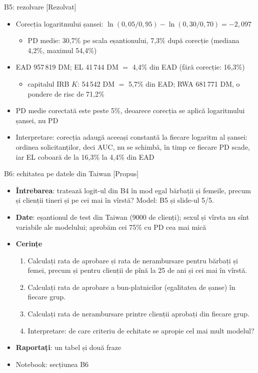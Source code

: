 \begin{frame}{B5: rezolvare [Rezolvat]}
\itemsize{\footnotesize}
\begin{itemize}
    \item Corecția logaritmului șansei: $\ln(0{,}05/0{,}95) - \ln(0{,}30/0{,}70) = -2{,}097$
    \begin{itemize}
        \item PD medie: 30{,}7\% pe scala eșantionului, 7{,}3\% după corecție (mediana 4{,}2\%, maximul 54{,}4\%)
    \end{itemize}
    \item EAD 957\,819 DM; EL 41\,744 DM $=$ 4{,}4\% din EAD (fără corecție: 16{,}3\%)
    \begin{itemize}
        \item capitalul IRB $K$: 54\,542 DM $=$ 5{,}7\% din EAD; RWA 681\,771 DM, o pondere de risc de 71{,}2\%
    \end{itemize}
    \item PD medie corectată este peste 5\%, deoarece corecția se aplică logaritmului șansei, nu PD
    \item Interpretare: corecția adaugă aceeași constantă la fiecare logaritm al șansei: ordinea solicitanților, deci AUC, nu se schimbă, în timp ce fiecare PD scade, iar EL coboară de la 16{,}3\% la 4{,}4\% din EAD
\end{itemize}
\end{frame}

\begin{frame}{B6: echitatea pe datele din Taiwan [Propus]}
\itemsize{\footnotesize}
\begin{itemize}
\item \textbf{Întrebarea}: tratează logit-ul din B4 în mod egal bărbații și femeile, precum și clienții tineri și pe cei mai în vîrstă? Model: B5 și slide-ul 5/5.
\item \textbf{Date}: eșantionul de test din Taiwan (9000 de clienți); sexul și vîrsta nu sînt variabile ale modelului; aprobăm cei 75\% cu PD cea mai mică
\item \textbf{Cerințe}
\begin{enumerate}
    \item Calculați rata de aprobare și rata de nerambursare pentru bărbați și femei, precum și pentru clienții de pînă la 25 de ani și cei mai în vîrstă.
    \item Calculați rata de aprobare a bun-platnicilor (egalitatea de șanse) în fiecare grup.
    \item Calculați rata de nerambursare printre clienții aprobați din fiecare grup.
    \item Interpretare: de care criteriu de echitate se apropie cel mai mult modelul?
\end{enumerate}
\item \textbf{Raportați}: un tabel și două fraze
\item Notebook: secțiunea B6
\end{itemize}
\end{frame}

